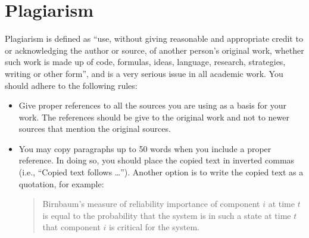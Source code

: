\section{Plagiarism}
Plagiarism is defined as ``use, without giving reasonable and appropriate credit to or acknowledging the author or source, of another person's original work, whether such work is made up of code, formulas, ideas, language, research, strategies, writing or other form'', and is a very serious issue in all academic work. You should adhere to the following rules:
\begin{itemize}
\item Give proper references to all the sources you are using as a basis for your work. The references should be give to the original work and not to newer sources that mention the original sources.
\item You may copy paragraphs up to 50 words when you include a proper reference. In doing so, you should place the copied text in inverted commas (i.e., ``Copied text follows \ldots''). Another option is to write the copied text as a quotation, for example:
\begin{quote}
Birnbaum's measure of reliability importance of component $i$ at time $t$ is equal to the probability that the system is in such a state at time $t$ that component $i$ is critical for the system.\newline \mbox{} \hfill \citet{rausand04}
\end{quote}
\end{itemize}



